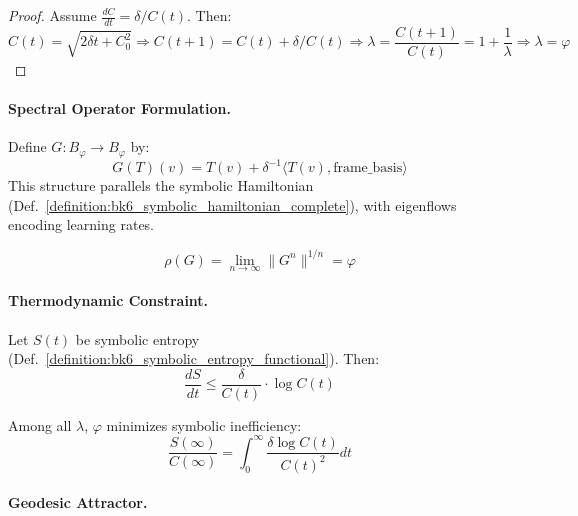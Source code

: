 \begin{proof}
Assume $\frac{dC}{dt} = \delta/C(t)$. Then:
\[
C(t) = \sqrt{2\delta t + C_0^2}
\Rightarrow C(t+1) = C(t) + \delta/C(t)
\Rightarrow \lambda = \frac{C(t+1)}{C(t)} = 1 + \frac{1}{\lambda}
\Rightarrow \lambda = \varphi
\]
\end{proof}

\paragraph{Spectral Operator Formulation.}
\label{paragraph:appC_spectral_interpretation_and_banach_operator_radius}

\begin{definition}
\label{def:appC_complexity_growth_operator}
Define $G : B_\varphi \to B_\varphi$ by:
\[
G(T)(v) = T(v) + \delta^{-1} \langle T(v), \text{frame\_basis} \rangle
\]
This structure parallels the symbolic Hamiltonian (Def.~\ref{definition:bk6_symbolic_hamiltonian_complete}), with eigenflows encoding learning rates.
\end{definition}

\begin{theorem}
\label{theorem:appC_phi_as_spectral_Radius}
\[
\rho(G) = \lim_{n \to \infty} \|G^n\|^{1/n} = \varphi
\]
\end{theorem}

\paragraph{Thermodynamic Constraint.}
\label{paragraph:appC_entropic_efficiency_and_thermodynamic_link}

\begin{definition}
\label{def:appC_complexity_entropy_tradeof}
Let $S(t)$ be symbolic entropy (Def.~\ref{definition:bk6_symbolic_entropy_functional}). Then:
\[
\frac{dS}{dt} \leq \frac{\delta}{C(t)} \cdot \log C(t)
\]
\end{definition}

\begin{theorem}
\label{theorem:appC_phi_minimized_entropy_per_complexity}
Among all $\lambda$, $\varphi$ minimizes symbolic inefficiency:
\[
\frac{S(\infty)}{C(\infty)} = \int_0^\infty \frac{\delta \log C(t)}{C(t)^2} dt
\]
\end{theorem}

\paragraph{Geodesic Attractor.}
\label{paragraph:geometric_attractor_and_phi_spiral}

